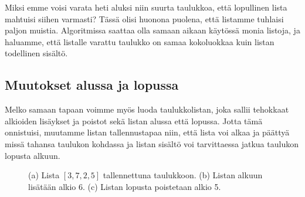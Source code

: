 Miksi emme voisi varata heti aluksi niin suurta taulukkoa,
että lopullinen lista mahtuisi siihen varmasti?
Tässä olisi huonona puolena, että listamme tuhlaisi paljon muistia.
Algoritmissa saattaa olla samaan aikaan käytössä monia listoja,
ja haluamme, että listalle varattu taulukko on samaa kokoluokkaa
kuin listan todellinen sisältö.

\subsection{Muutokset alussa ja lopussa}

Melko samaan tapaan voimme myös luoda taulukkolistan,
joka sallii tehokkaat alkioiden lisäykset ja poistot
sekä listan alussa että lopussa.
Jotta tämä onnistuisi, muutamme listan tallennustapaa niin,
että lista voi alkaa ja päättyä missä tahansa taulukon
kohdassa ja listan sisältö voi tarvittaessa jatkua taulukon lopusta alkuun.

\begin{figure}
\center
{}
\caption{(a) Lista $[3,7,2,5]$ tallennettuna taulukkoon.
(b) Listan alkuun lisätään alkio 6.
(c) Listan lopusta poistetaan alkio 5.}
\label{fig:lismol}
\end{figure}


